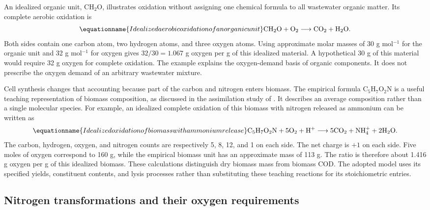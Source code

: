 An idealized organic unit, $\mathrm{CH_2O}$, illustrates oxidation without assigning one chemical formula to all wastewater organic matter. Its complete aerobic oxidation is
\begin{equation}
\equationname{Idealized aerobic oxidation of an organic unit}
\mathrm{CH_2O}+\mathrm{O_2}\longrightarrow\mathrm{CO_2}+\mathrm{H_2O}.
\label{eq:teaching_carbon_oxidation}
\end{equation}
Both sides contain one carbon atom, two hydrogen atoms, and three oxygen atoms. Using approximate molar masses of 30 g mol$^{-1}$ for the organic unit and 32 g mol$^{-1}$ for oxygen gives $32/30=1.067$ g oxygen per g of this idealized material. A hypothetical 30 g of this material would require 32 g oxygen for complete oxidation. The example explains the oxygen-demand basis of organic components. It does not prescribe the oxygen demand of an arbitrary wastewater mixture.

Cell synthesis changes that accounting because part of the carbon and nitrogen enters biomass. The empirical formula $\mathrm{C_5H_7O_2N}$ is a useful teaching representation of biomass composition, as discussed in the assimilation study of \citet{Hoover1952}. It describes an average composition rather than a single molecular species. For example, an idealized complete oxidation of this biomass with nitrogen released as ammonium can be written as
\begin{equation}
\equationname{Idealized oxidation of biomass with ammonium release}
\mathrm{C_5H_7O_2N}+5\mathrm{O_2}+\mathrm{H^+}
\longrightarrow5\mathrm{CO_2}+\mathrm{NH_4^+}+2\mathrm{H_2O}.
\label{eq:teaching_biomass_oxidation}
\end{equation}
The carbon, hydrogen, oxygen, and nitrogen counts are respectively 5, 8, 12, and 1 on each side. The net charge is $+1$ on each side. Five moles of oxygen correspond to 160 g, while the empirical biomass unit has an approximate mass of 113 g. The ratio is therefore about 1.416 g oxygen per g of this idealized biomass. These calculations distinguish dry biomass mass from biomass COD. The adopted model uses its specified yields, constituent contents, and lysis processes rather than substituting these teaching reactions for its stoichiometric entries.

\subsection{Nitrogen transformations and their oxygen requirements}

